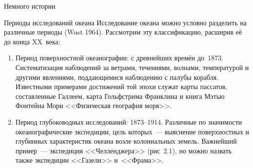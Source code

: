 \begin{chapter}{Немного истории}
\begin{section}{Периоды исследований океана}
Исследование океана можно условно разделить на различные периоды 
(Wust 1964). Рассмотрим эту классификацию, расширив её до конца XX~века:
%
\begin{enumerate}
\item  
Период поверхностной океанографии: с древнейших времён до~1873. 
Систематизация наблюдений за ветрами,
течениями, волнами, температурой и другими явлениями, поддающимися
наблюдению с палубы корабля. Известными примерами достижений той эпохи 
служат карты пассатов, составленные Галлеем, карта Гольфстрима Франклина 
и книга Мэтью Фонтейна Мори <<Физическая география моря>>.
%

\item
Период глубоководных исследований: 1873--1914.
Различные по значимости океанографические экспедиции, цель 
которых~--- выяснение поверхностных и глубинных характеристик океана возле
колониальных земель. Важнейший пример~--- экспедиция
<<Челленджера>> (рис~2.1), но можно назвать также экспедиции <<Газели>> 
и~<<Фрама>>.
%


\end{enumerate}
\end{section}
\end{chapter}
